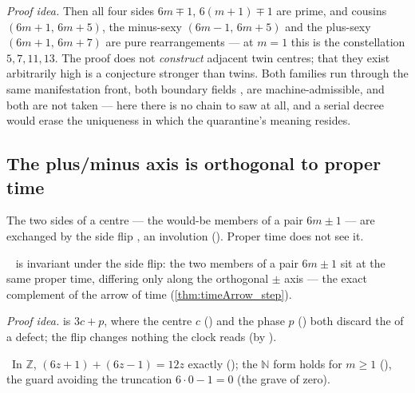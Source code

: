 \emph{Proof idea.} Then all four sides $6m\mp1$, $6(m+1)\mp1$ are prime, and cousins
$(6m+1,\,6m+5)$, the minus-sexy $(6m-1,\,6m+5)$ and the plus-sexy $(6m+1,\,6m+7)$ are pure
rearrangements --- at $m=1$ this is the constellation $5,7,11,13$. The proof does not
\emph{construct} adjacent twin centres; that they exist arbitrarily high is a conjecture
stronger than twins. Both families run through the same manifestation front, both boundary
fields ,  are machine-admissible, and both are not
taken --- here there is no chain to saw at all, and a serial decree would erase the uniqueness
in which the quarantine's meaning resides.

\subsection{The plus/minus axis is orthogonal to proper time}

The two sides of a centre --- the would-be members of a pair $6m\pm1$ --- are exchanged by the side
flip , an involution (). Proper time does not see it.

\begin{theorem}\label{thm:lexRank_side_invariant}
\green{}\  is invariant under the side flip: the two members of a pair $6m\pm1$ sit at
the same proper time, differing only along the orthogonal $\pm$ axis --- the exact complement of the
arrow of time (\cref{thm:timeArrow_step}). 
\end{theorem}

\emph{Proof idea.}  is $3c+p$, where the centre $c$ () and the phase $p$
() both discard the  of a defect; the flip changes nothing the clock reads
(by ).

\begin{theorem}\label{thm:signedSideValue_reflection_sum}
\green{}\ In $\mathbb{Z}$, $(6z+1)+(6z-1)=12z$ exactly (); the
$\mathbb{N}$ form holds for $m\ge 1$ (), the guard avoiding the
truncation $6\cdot 0-1=0$ (the grave of zero). 
\end{theorem}


